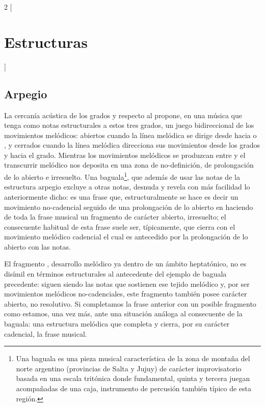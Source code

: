 \documentclass[a4paper,10pt]{article}
\begin{document}
\begin{multicols}{2}
[\section{Estructuras}\label{sec:estructuras}]
  \subsection{Arpegio}\label{subsec:arpegio}
  La cercanía acústica de los grados  y  respecto al  propone, en una música que tenga como notas estructurales a estos tres grados, un juego bidireccional de los movimientos melódicos: abiertos cuando la línea melódica se dirige desde  hacia  o , y cerrados cuando la línea melódica direcciona sus movimientos desde los grados  y  hacia el  grado. Mientras los movimientos melódicos se produzcan entre  y  el transcurrir melódico nos deposita en una zona de no-definición, de prolongación de lo abierto e irresuelto. Una baguala\footnote{Una baguala es una pieza musical característica de la zona de montaña del norte argentino (provincias de Salta y Jujuy) de carácter improvisatorio basada en una escala tritónica donde fundamental, quinta y tercera juegan acompañadas de una caja, instrumento de percusión también típico de esta región.}, que además de usar las notas de la estructura arpegio excluye a otras notas, desnuda y revela con más facilidad lo anteriormente dicho:  es una frase que, estructuralmente se hace  es decir un movimiento no-cadencial  seguido de una prolongación de lo abierto en  haciendo de toda la frase musical un fragmento de carácter abierto, irresuelto; el consecuente habitual de esta frase suele ser, típicamente,  que cierra con el movimiento melódico cadencial  el cual es antecedido por la prolongación de lo abierto con las notas\hbox{.}

  El fragmento , desarrollo melódico ya dentro de un ámbito heptatónico, no es disímil en términos estructurales al antecedente del ejemplo de baguala precedente:  siguen siendo las notas que sostienen ese tejido melódico y, por ser movimientos melódicos no-cadenciales, este fragmento también posee carácter abierto, no resolutivo. Si completamos la frase anterior con un posible fragmento como  estamos, una vez más, ante una situación análoga al consecuente de la baguala: una estructura melódica  que completa y cierra, por su carácter cadencial, la frase musical.


\end{multicols}
\end{document}
